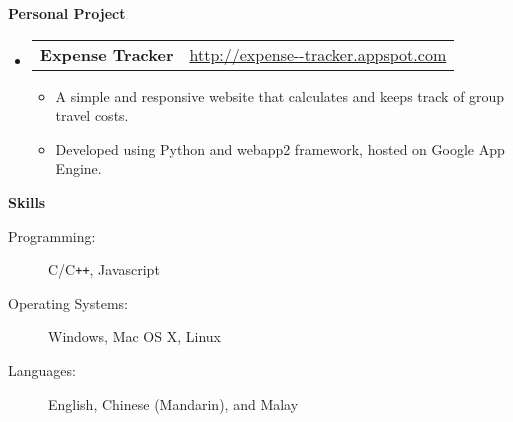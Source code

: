 \documentclass[letterpaper,11pt]{article}
\makeatletter
\newcommand{\resitem}[1]{\item #1 \vspace{-2pt}}
\newcommand{\resheading}[1]{{\begin{mdframed}[backgroundcolor=mygray]{\large \textbf{#1}}\end{mdframed}}}
\newcommand{\restitle}[2]{
\begin{tabular*}{7.0in}{l@{\extracolsep{\fill}}r}
		\textbf{#1} & #2 \\
\end{tabular*}}
\makeatother
\begin{document}
\resheading{Personal Project}

\begin{itemize}
\item
	\restitle{Expense Tracker}{\href{http://expense--tracker.appspot.com/}{http://expense-{}-tracker.appspot.com}}
	\vspace{-6pt}
	\begin{itemize}
		\resitem{A simple and responsive website that calculates and keeps track of group travel costs.}
		\resitem{Developed using Python and webapp2 framework, hosted on Google App Engine.}
	\end{itemize}
\end{itemize}


\resheading{Skills}

\begin{description}
\item[Programming:]
C/C{}\verb!++!, Javascript
\item[Operating Systems:]
Windows, Mac OS X, Linux
\item[Languages:]
English, Chinese (Mandarin), and Malay
\end{description}
\end{document}
